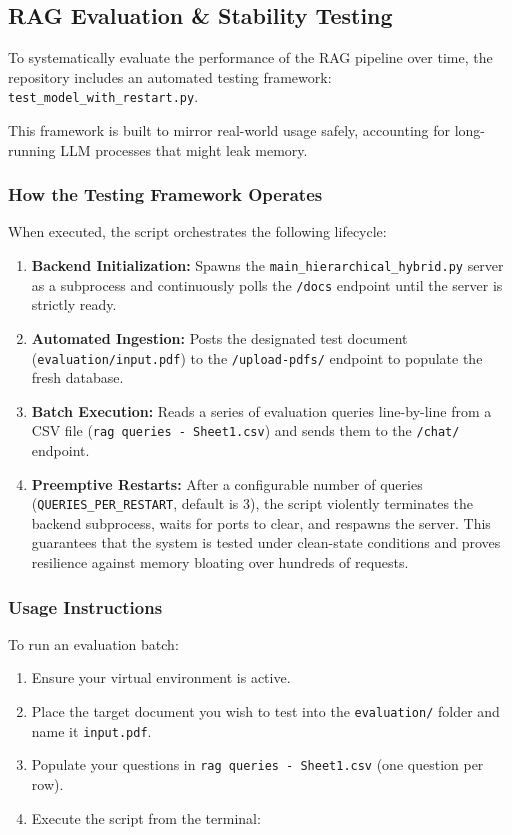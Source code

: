 \documentclass[11pt, a4paper]{article}
\begin{document}
\subsection{RAG Evaluation \& Stability Testing}

To systematically evaluate the performance of the RAG pipeline over time, the repository includes an automated testing framework: \texttt{test\_model\_with\_restart.py}.

This framework is built to mirror real-world usage safely, accounting for long-running LLM processes that might leak memory.

\subsubsection{How the Testing Framework Operates}
When executed, the script orchestrates the following lifecycle:
\begin{enumerate}
    \item \textbf{Backend Initialization:} Spawns the \texttt{main\_hierarchical\_hybrid.py} server as a subprocess and continuously polls the \texttt{/docs} endpoint until the server is strictly ready.
    \item \textbf{Automated Ingestion:} Posts the designated test document (\texttt{evaluation/input.pdf}) to the \texttt{/upload-pdfs/} endpoint to populate the fresh database.
    \item \textbf{Batch Execution:} Reads a series of evaluation queries line-by-line from a CSV file (\texttt{rag queries - Sheet1.csv}) and sends them to the \texttt{/chat/} endpoint.
    \item \textbf{Preemptive Restarts:} After a configurable number of queries (\texttt{QUERIES\_PER\_RESTART}, default is 3), the script violently terminates the backend subprocess, waits for ports to clear, and respawns the server. This guarantees that the system is tested under clean-state conditions and proves resilience against memory bloating over hundreds of requests.
\end{enumerate}

\subsubsection{Usage Instructions}

To run an evaluation batch:
\begin{enumerate}
    \item Ensure your virtual environment is active.
    \item Place the target document you wish to test into the \texttt{evaluation/} folder and name it \texttt{input.pdf}.
    \item Populate your questions in \texttt{rag queries - Sheet1.csv} (one question per row).
    \item Execute the script from the terminal:
\end{enumerate}
\end{document}
